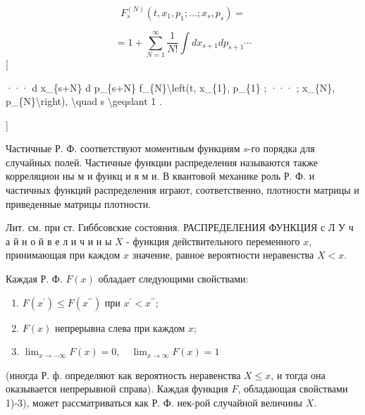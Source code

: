 \documentclass[10pt]{article}
\begin{document}
\[

F_{s}^{(N)}\left(t, x_{1}, p_{1} ; \ldots ; x_{s}, p_{s}\right)=

\]



\[

=1+\sum_{N=1}^{\infty} \frac{1}{N !} \int d x_{s+1} d p_{s+1} \cdots

\][



··· d x\_\{s+N\} d p\_\{s+N\} f\_\{N\}\textbackslash left(t, x\_\{1\}, p\_\{1\} ; ··· ; x\_\{N\}, p\_\{N\}\textbackslash right), \textbackslash quad s \textbackslash geqslant 1 .

]



Частичные Р. Ф. соответствуют моментным функциям $s$-го порядка для случайных полей. Частичные функции распределения называются также корреляцион ны м и функц и я м и. В квантовой механике роль Р. Ф. и частичных функций распределения играют, соответственно, плотности матрицы и приведенные матрицы плотности.



Лит. см. при ст. Гиббсовские состояния. РАСПРЕДЕЛЕНИЯ ФУНКЦИЯ с Л У ч а й н о й в е л и ч и н ы $X$ - функция действительного переменного $x$, принимающая при каждом $x$ значение, равное вероятности неравенства $X<x$.



Каждая Р. Ф. $F(x)$ обладает следующими свойствами:



\begin{enumerate}

  \item $F\left(x^{\prime}\right) \leqslant F\left(x^{\prime \prime}\right)$ при $x^{\prime}<x^{\prime \prime}$;



  \item $F(x)$ непрерывна слева при каждом $x$;



  \item $\lim _{x \rightarrow-\infty} F(x)=0, \quad \lim _{x \rightarrow \infty} F(x)=1$



\end{enumerate}



(иногда Р. ф. определяют как вероятность неравенства $X \leqslant x$, и тогда она оказывается непрерывной справа). Каждая функция $F$, обладающая свойствами 1)-3), может рассматриваться как Р. Ф. нек-рой случайной величины $X$.
\end{document}
